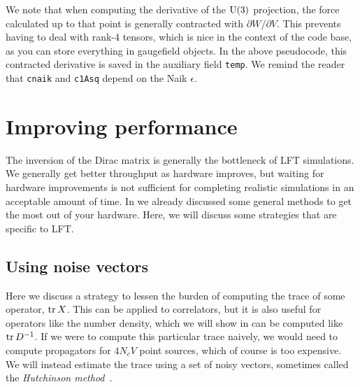 We note that when computing the derivative of the $\operatorname{U}(3)$ projection, the force
calculated up to that point is generally contracted with $\partial W/\partial
V$. This prevents having to deal with rank-4 tensors, which is nice in the
context of the code base, as you can store everything in gaugefield objects.
In the above pseudocode, this contracted derivative is saved in the 
auxiliary field \texttt{temp}. We remind the reader that \texttt{cnaik} and
\texttt{c1Asq} depend on the Naik $\epsilon$. 

\section{Improving performance}

The inversion of the Dirac matrix is generally the bottleneck of LFT
simulations. We generally get better throughput as hardware improves, 
but waiting for hardware improvements is not sufficient for completing realistic
simulations in an acceptable amount of time. In  we
already discussed some general methods to get the most out of your hardware.
Here, we will discuss some strategies that are specific to LFT.

\subsection{Using noise vectors}\label{sec:noiseVector}

Here we discuss a strategy to lessen the burden of computing the trace of some
operator, $\tr X$. This can be applied to correlators, but it is also useful for
operators like the number density, which we will show in 
can be computed like $\tr D^{-1}$. 
If we were to compute this particular trace
naively, we would need to compute propagators for $4N_cV$ point sources,
which of course is too expensive.
We will instead estimate the trace using a set of
noisy vectors, sometimes called the {\it Hutchinson
method}~\cite{hutchinson_stochastic_1990}.

